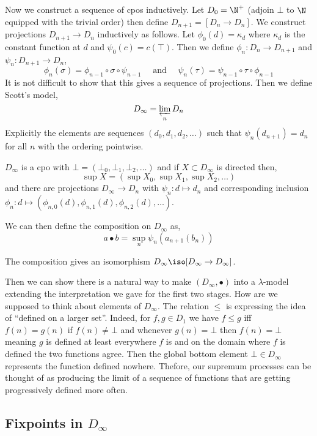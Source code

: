 \documentclass[12pt]{article}
\begin{document}
Now we construct a sequence of cpos inductively. Let $D_0 = \N^+$ (adjoin $\bot$ to $\N$ equipped with the trivial order) then define $D_{n+1} = [D_n \to D_n]$. We construct projections $D_{n+1} \to D_n$ inductively as follows. Let $\phi_0(d) = \kappa_d$ where $\kappa_d$ is the constant function at $d$ and $\psi_0(c) = c(\top)$. Then we define $\phi_n : D_n \to D_{n+1}$ and $\psi_n : D_{n+1} \to D_n$,
\[ \phi_n(\sigma) = \phi_{n-1} \circ \sigma \circ \psi_{n-1} \quad \text{ and } \quad \psi_n(\tau) = \psi_{n-1} \circ \tau \circ \phi_{n-1} \]
It is not difficult to show that this gives a sequence of projections. Then we define Scott's model,
\[ D_{\infty} = \varprojlim_{n} D_n \]
Explicitly the elements are sequences $(d_0, d_1, d_2, \dots)$ such that $\psi_n(d_{n+1}) = d_{n}$ for all $n$ with the ordering pointwise. 

\begin{prop}
$D_\infty$ is a cpo with $\bot = (\bot_0, \bot_1, \bot_2, \dots)$ and if $X \subset D_{\infty}$ is directed then,
\[ \sup X = (\sup X_0, \sup X_1, \sup X_2, \dots) \]
and there are projections $D_{\infty} \to D_n$ with $\psi_n : d \mapsto d_n$ and corresponding inclusion $\phi_n : d \mapsto (\phi_{n,0}(d), \phi_{n,1}(d), \phi_{n,2}(d), \dots)$.
\end{prop}

We can then define the composition on $D_{\infty}$ as,
\[ a \bullet b = \sup_n \psi_n(a_{n+1}(b_n)) \]

\begin{prop}
The composition gives an isomorphism $D_{\infty} \iso [D_{\infty} \to D_{\infty}]$. 
\end{prop}

Then we can show there is a natural way to make $(D_\infty, \bullet)$ into a $\lambda$-model extending the interpretation we gave for the first two stages. How are we supposed to think about elements of $D_\infty$. The relation $\le$ is expressing the idea of ``defined on a larger set''. Indeed, for $f,g \in D_1$ we have $f \le g$ iff $f(n) = g(n)$ if $f(n) \neq \bot$ and whenever $g(n) = \bot$ then $f(n) = \bot$ meaning $g$ is defined at least everywhere $f$ is and on the domain where $f$ is defined the two functions agree. Then the global bottom element $\bot \in D_\infty$ represents the function defined nowhere. Thefore, our supremum processes can be thought of as producing the limit of a sequence of functions that are getting progressively defined more often. 

\subsection{Fixpoints in $D_{\infty}$}
\end{document}
